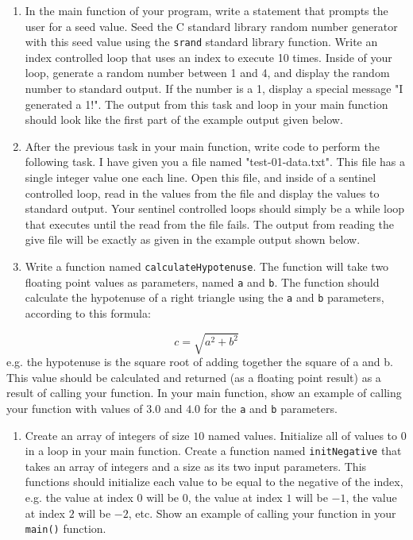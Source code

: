 \documentclass[11pt]{article}
\begin{document}
\begin{enumerate}
\item In the main function of your program, write a statement that
prompts the user for a seed value.  Seed the C standard library
random number generator with this seed value using the \verb~srand~
standard library function.  Write an index controlled loop that
uses an index to execute 10 times.  Inside of your loop, generate a
random number between 1 and 4, and display the random number to
standard output.  If the number is a 1, display a special message
"I generated a 1!".  The output from this task and loop in your
main function should look like the first part of the example
output given below.

\item After the previous task in your main function, write code to
perform the following task.  I have given you a file named
"test-01-data.txt".  This file has a single integer value
one each line.  Open this file, and inside of a sentinel 
controlled loop, read in the values from the file and
display the values to standard output.  Your sentinel
controlled loops should simply be a while loop that executes
until the read from the file fails.  The output from
reading the give file will be exactly as given in 
the example output shown below.

\item Write a function named \verb~calculateHypotenuse~.  The function 
will take two floating point values as parameters, named \verb~a~
and \verb~b~.  The function should calculate the hypotenuse of 
a right triangle using the \verb~a~ and \verb~b~ parameters, according
to this formula:
\end{enumerate}
$$
c = \sqrt{a^2 + b^2}
$$
  e.g. the hypotenuse is the square root of adding together the
  square of a and b.  This value should be calculated and returned
  (as a floating point result) as a result of calling your function.
  In your main function, show an example of calling your function with
  values of $3.0$ and $4.0$ for the \verb~a~ and \verb~b~ parameters.

\begin{enumerate}
\item Create an array of integers of size $10$ named values.  Initialize
all of values to $0$ in a loop in your main function.  Create a
function named \verb~initNegative~ that takes an array of integers
and a size as its two input parameters.  This functions
should initialize each value to be equal to the negative
of the index, e.g. the value at index $0$ will be $0$, the
value at index $1$ will be $-1$, the value at index $2$ will be
$-2$, etc.  Show an example of calling your function in your
\verb~main()~ function.
\end{enumerate}
\end{document}
